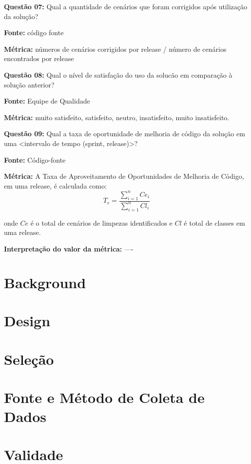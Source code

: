 \textbf{Questão 07:} Qual a quantidade de cenários que foram corrigidos após utilização da solução?

\textbf{Fonte:} código fonte

\textbf{Métrica:} números de cenários corrigidos por release / número de cenários encontrados por release \newline



\textbf{Questão 08:} Qual o nível de satisfação do uso da solucão em comparação à solução anterior?

\textbf{Fonte:} Equipe de Qualidade

\textbf{Métrica:} muito satisfeito, satisfeito, neutro, insatisfeito, muito insatisfeito. \newline




\textbf{Questão 09:} Qual a taxa de oportunidade de melhoria de código da solução em uma <intervalo de tempo (sprint, release)>?

\textbf{Fonte:} Código-fonte

\textbf{Métrica:}  A Taxa de Aproveitamento de Oportunidades de Melhoria de Código, em uma release, é calculada como: $$ T_r =   \frac{{\sum_{i=1}^{n}{Ce_i}}}{\sum_{i=1}^{n}{Cl_i}} $$

onde $ Ce $ é o total de cenários de limpezas identificados e $ Cl $ é total de classes em uma release.

\textbf{Interpretação do valor da métrica:} ----  \newline

\section{Background}

\section{Design}

\section{Seleção}

\section{Fonte e Método de Coleta de Dados}

\section{Validade}

